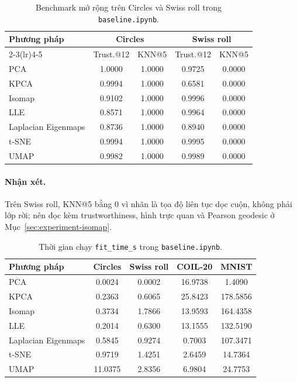\begin{table}[H]
  \centering
  \caption{Benchmark mở rộng trên Circles và Swiss roll trong \texttt{baseline.ipynb}.}
  \label{tab:extended-benchmark-circles-swiss}
  \begin{tabular}{@{}lcccc@{}}
    \toprule
    \textbf{Phương pháp} & \multicolumn{2}{c}{\textbf{Circles}} & \multicolumn{2}{c}{\textbf{Swiss roll}} \\
    \cmidrule(lr){2-3}\cmidrule(lr){4-5}
    & Trust.@12 & KNN@5 & Trust.@12 & KNN@5 \\
    \midrule
    PCA & 1.0000 & 1.0000 & 0.9725 & 0.0000 \\
    KPCA & 0.9994 & 1.0000 & 0.6581 & 0.0000 \\
    Isomap & 0.9102 & 1.0000 & 0.9996 & 0.0000 \\
    LLE & 0.8571 & 1.0000 & 0.9964 & 0.0000 \\
    Laplacian Eigenmaps & 0.8736 & 1.0000 & 0.8940 & 0.0000 \\
    t-SNE & 0.9994 & 1.0000 & 0.9995 & 0.0000 \\
    UMAP & 0.9982 & 1.0000 & 0.9989 & 0.0000 \\
    \bottomrule
  \end{tabular}
\end{table}

\paragraph{Nhận xét.}
Trên Swiss roll, KNN@5 bằng 0 vì nhãn là tọa độ liên tục dọc cuộn, không phải
lớp rời; nên đọc kèm trustworthiness, hình trực quan và Pearson geodesic ở
Mục~\ref{sec:experiment-isomap}.

\begin{table}[H]
  \centering
  \caption{Thời gian chạy \texttt{fit\_time\_s} trong \texttt{baseline.ipynb}.}
  \label{tab:extended-benchmark-runtime}
  \begin{tabular}{@{}lcccc@{}}
    \toprule
    Phương pháp & Circles & Swiss roll & COIL-20 & MNIST \\
    \midrule
    PCA & 0.0024 & 0.0002 & 16.9738 & 1.4090 \\
    KPCA & 0.2363 & 0.6065 & 25.8423 & 178.5856 \\
    Isomap & 0.3734 & 1.7866 & 13.9593 & 164.4358 \\
    LLE & 0.2014 & 0.6300 & 13.1555 & 132.5190 \\
    Laplacian Eigenmaps & 0.5845 & 0.9274 & 0.7003 & 107.3471 \\
    t-SNE & 0.9719 & 1.4251 & 2.6459 & 14.7364 \\
    UMAP & 11.0375 & 2.8356 & 6.9804 & 24.7753 \\
    \bottomrule
  \end{tabular}
\end{table}

